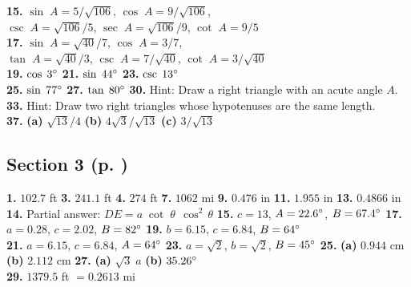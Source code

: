 {\begin{multicols}{2}
\textbf{15.} $\sin\;A = 5/\sqrt{106}$, $\cos\;A = 9/\sqrt{106}$,\\
$\csc\;A = \sqrt{106}/5$, $\sec\;A = \sqrt{106}/9$, $\cot\;A = 9/5$\\
\textbf{17.} $\sin\;A = \sqrt{40}/7$, $\cos\;A = 3/7$,\\$\tan\;A = \sqrt{40}/3$,
$\csc\;A = 7/\sqrt{40}$, $\cot\;A = 3/\sqrt{40}$\\
\textbf{19.} $\cos\;3^\circ$ \quad \textbf{21.} $\sin\;44^\circ$ \quad
\textbf{23.} $\csc\;13^\circ$\\
\textbf{25.} $\sin\;77^\circ$ \quad
\textbf{27.} $\tan\;80^\circ$ \quad \textbf{30.} Hint: Draw a right triangle with an acute
angle $A$.\\
\textbf{33.} Hint: Draw two right triangles whose hypotenuses are the same length.\\
\textbf{37.} \textbf{(a)} $\sqrt{13}/4$ \textbf{(b)} $4\sqrt{3}/\sqrt{13}$
\textbf{(c)} $3/\sqrt{13}$
\subsection*{Section 3 (p. \pageref{sec1dot3})}
\textbf{1.} $102.7$ ft \quad \textbf{3.} $241.1$ ft \quad \textbf{4.} $274$ ft \quad
\textbf{7.} $1062$ mi \quad \textbf{9.} $0.476$ in \quad \textbf{11.} $1.955$ in \quad
\textbf{13.} $0.4866$ in \quad \textbf{14.} Partial answer: $DE=a\;\cot\;\theta\;\,\cos^2\,\theta$
\quad \textbf{15.} $c=13$, $A=22.6^\circ$, $B=67.4^\circ$ \quad \textbf{17.} $a=0.28$, $c=2.02$,
$B=82^\circ$ \quad \textbf{19.} $b=6.15$, $c=6.84$, $B=64^\circ$\\
\textbf{21.} $a=6.15$, $c=6.84$, $A=64^\circ$ \quad \textbf{23.} $a=\sqrt{2}$, $b=\sqrt{2}$,
$B=45^\circ$ \quad \textbf{25.} \textbf{(a)} $0.944$ cm\\\textbf{(b)} $2.112$ cm \quad
\textbf{27.} \textbf{(a)} $\sqrt{3}\;a$ \quad \textbf{(b)} $35.26^\circ$\\\textbf{29.} $1379.5$ ft $= 0.2613$ mi

\end{multicols}}

